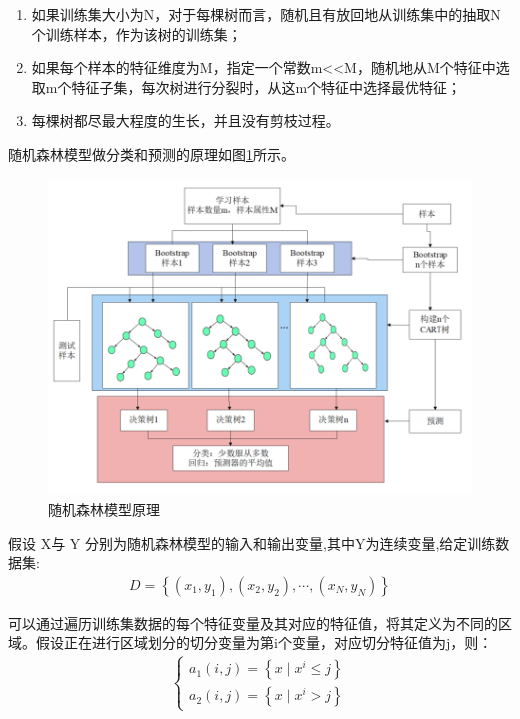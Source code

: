 \documentclass[bwprint]{gmcmthesis}
\begin{document}
\begin{enumerate}
    \item 如果训练集大小为N，对于每棵树而言，随机且有放回地从训练集中的抽取N个训练样本，作为该树的训练集；
    \item 如果每个样本的特征维度为M，指定一个常数m<<M，随机地从M个特征中选取m个特征子集，每次树进行分裂时，从这m个特征中选择最优特征；
    \item 每棵树都尽最大程度的生长，并且没有剪枝过程。
    
\end{enumerate}
随机森林模型做分类和预测的原理如图\ref{fig:随机森林原理}所示。
\begin{figure}[h]
    \centering
    \includegraphics[width = \linewidth]{figures/随机森林模型原理图 .png}
    \caption{随机森林模型原理}
    \label{fig:随机森林原理}
\end{figure}

假设 X与 Y 分别为随机森林模型的输入和输出变量,其中Y为连续变量,给定训练数据集:
\begin{equation}
\begin{aligned}
D=\left\{\left(x_1, y_1\right),\left(x_2, y_2\right), \cdots,\left(x_N, y_N\right)\right\}
\end{aligned}
\label{equ:9}
\end{equation}

可以通过遍历训练集数据的每个特征变量及其对应的特征值，将其定义为不同的区域。假设正在进行区域划分的切分变量为第i个变量，对应切分特征值为j，则：
\begin{equation}
\begin{aligned}
\left\{\begin{array}{l}
a_1(i, j)=\left\{x \mid x^i \leq j\right\} \\
a_2(i, j)=\left\{x \mid x^i>j\right\}
\end{array}\right.
\end{aligned}
\label{equ:10}
\end{equation}
\end{document}

